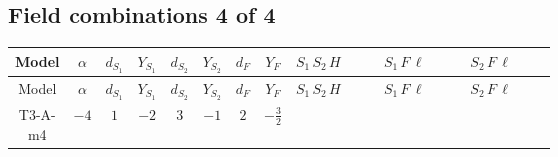 \documentclass[8pt]{article}
\begin{document}
\begin{landscape}
\subsection*{Field combinations 4 of 4}
\begin{longtable}{@{}cccccccc >{\raggedright\arraybackslash}p{0.21\linewidth} >{\raggedright\arraybackslash}p{0.21\linewidth} >{\raggedright\arraybackslash}p{0.21\linewidth}@{}}
\toprule
Model & $\alpha$ & $d_{S_1}$ & $Y_{S_1}$ & $d_{S_2}$ & $Y_{S_2}$ & $d_F$ & $Y_F$ & $S_1\,S_2\,H$ & $S_1\,F\,\ell$ & $S_2\,F\,\ell$ \\
\midrule
\endfirsthead
\toprule
Model & $\alpha$ & $d_{S_1}$ & $Y_{S_1}$ & $d_{S_2}$ & $Y_{S_2}$ & $d_F$ & $Y_F$ & $S_1\,S_2\,H$ & $S_1\,F\,\ell$ & $S_2\,F\,\ell$ \\
\midrule
\endhead
T3-A-m4 & $-4$ & $1$ & $-2$ & $3$ & $-1$ & $2$ & $-\frac{3}{2}$ & \scriptsize\adjustbox{max width=\linewidth}{$\begin{gathered} +\overline{\lambda_5} S_{2,j_1} {\mathcal{I}_{LLS_1S_2}}^{*}_{a_1,a_2,j_1} H_{a_1}{}^{\dagger } H_{a_2}{}^{\dagger } S_1{}^{\dagger } \\ +H_{a_1} H_{a_2} S_1 \mathcal{I}_{T3,a_1,a_2,j_1} \lambda_5 S_{2,j_1}{}^{\dagger }\end{gathered}$} & \scriptsize\adjustbox{max width=\linewidth}{$\begin{gathered} +\overline{L_{a_1,i_1}}\, C\, P_R\, \overline{F_{j_1,r_1}}{}^T S_1 y_{1,i_1,r_1} \mathcal{I}_{y_1,a_1,j_1} \\ +\overline{y_{1,i_1,r_1}} L_{a_1,i_1}{}^T\, C\, P_L\, F_{j_1,r_1} {\mathcal{C}_{LS_1F}}^{*}_{a_1,j_1} S_1{}^{\dagger }\end{gathered}$} & \scriptsize\adjustbox{max width=\linewidth}{$\begin{gathered} +\overline{y_{2,i_1,r_1}} \overline{F_{j_1,r_1}}\, P_L\, L_{a_1,i_1} S_{2,j_1} {\mathcal{C}_{LS_2F}}^{*}_{a_1,j_1,j_1} \\ +\overline{L_{a_1,i_1}}\, P_R\, F_{j_1,r_1} y_{2,i_1,r_1} \mathcal{I}_{y_2,a_1,j_1,j_1} S_{2,j_1}{}^{\dagger }\end{gathered}$} \\
\midrule

\end{longtable}
\end{landscape}
\end{document}
